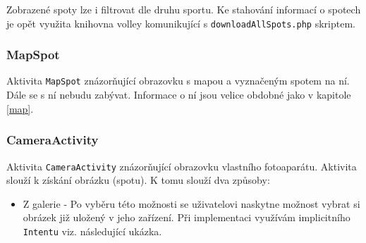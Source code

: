 \documentclass[12pt]{article}
\begin{document}
Zobrazené spoty lze i filtrovat dle druhu sportu. Ke stahování informací o spotech je opět využita knihovna volley komunikující s \verb+downloadAllSpots.php+ skriptem.
\subsubsection{MapSpot}
Aktivita \verb+MapSpot+ znázorňující obrazovku s mapou a vyznačeným spotem na ní. Dále se s ní nebudu zabývat. Informace o ní jsou velice obdobné jako v kapitole \ref{map}.
\subsubsection{CameraActivity}
Aktivita \verb+CameraActivity+ znázorňující obrazovku vlastního fotoaparátu. Aktivita slouží k získání obrázku (spotu). K tomu slouží dva způsoby:
\begin{itemize}
\item Z galerie - Po vyběru této možnosti se uživatelovi naskytne možnost vybrat si obrázek již uložený v jeho zařízení. Při implementaci využívám implicitního \verb+Intentu+ viz. následující ukázka.


\end{itemize}
\end{document}
